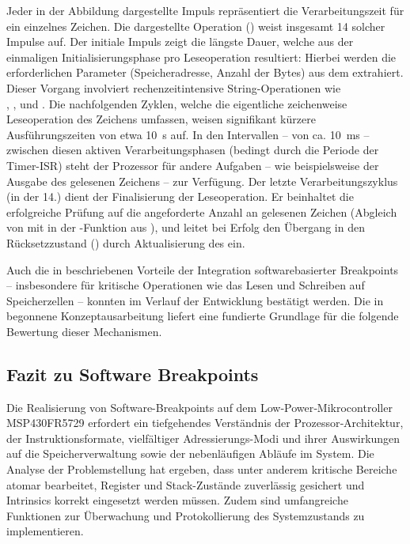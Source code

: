 \newpage
Jeder in der Abbildung dargestellte Impuls repr\"asentiert die Verarbeitungszeit f\"ur ein einzelnes Zeichen. Die dargestellte Operation () weist insgesamt 14 solcher Impulse auf. Der initiale Impuls zeigt die l\"angste Dauer, welche aus der einmaligen Initialisierungsphase pro Leseoperation resultiert: Hierbei werden die erforderlichen Parameter (Speicheradresse, Anzahl der Bytes) aus dem  extrahiert. Dieser Vorgang involviert rechenzeitintensive String-Operationen wie \\, ,  und . Die nachfolgenden Zyklen, welche die eigentliche zeichenweise Leseoperation des Zeichens umfassen, weisen signifikant k\"urzere Ausf\"uhrungszeiten von etwa 10~\textmu s auf. In den Intervallen -- von ca. 10~ms -- zwischen diesen aktiven Verarbeitungsphasen (bedingt durch die Periode der Timer-ISR) steht der Prozessor f\"ur andere Aufgaben -- wie beispielsweise der Ausgabe des gelesenen Zeichens -- zur Verf\"ugung. Der letzte Verarbeitungszyklus (in  der 14.) dient der Finalisierung der Leseoperation. Er beinhaltet die erfolgreiche Pr\"ufung auf die angeforderte Anzahl an gelesenen Zeichen (Abgleich von  mit  in der -Funktion aus ), und leitet bei Erfolg den \"Ubergang in den R\"ucksetzzustand () durch Aktualisierung des  ein.

Auch die in  beschriebenen Vorteile der Integration softwarebasierter Breakpoints -- insbesondere f\"ur kritische Operationen wie das Lesen und Schreiben auf Speicherzellen -- konnten im Verlauf der Entwicklung best\"atigt werden. Die in  begonnene Konzeptausarbeitung liefert eine fundierte Grundlage f\"ur die folgende Bewertung dieser Mechanismen.\AI


\newpage
\subsection{Fazit zu Software Breakpoints}
\label{sec:FazitSoftwareBreakpoints}

Die Realisierung von Software-Breakpoints auf dem Low‑Power‑Mikrocontroller \\MSP430FR5729 erfordert ein tiefgehendes Verst\"andnis der Prozessor‑Architektur, der Instruktionsformate, vielf\"altiger Adressierungs-Modi und ihrer Auswirkungen auf die Speicherverwaltung sowie der nebenl\"aufigen Abl\"aufe im System. Die Analyse der Problemstellung hat ergeben, dass unter anderem kritische Bereiche atomar bearbeitet, Register und Stack-Zust\"ande zuverl\"assig gesichert und Intrinsics korrekt eingesetzt werden m\"ussen. Zudem sind umfangreiche Funktionen zur \"Uberwachung und Protokollierung des Systemzustands zu implementieren.

